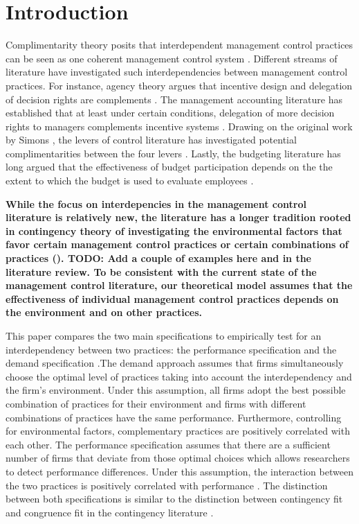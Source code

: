 \documentclass[12pt]{article}
\begin{document}
\section{Introduction}\label{introduction}

Complimentarity theory posits that interdependent management control
practices can be seen as one coherent management control system
\citep{Milgrom1995, Grabner2013}. Different streams of literature have
investigated such interdependencies between management control
practices. For instance, agency theory argues that incentive design and
delegation of decision rights are complements \citep{Holmstrom1994}. The
management accounting literature has established that at least under
certain conditions, delegation of more decision rights to managers
complements incentive systems
\citep{Moers2006, Indjejikian2012, Bouwens2007}. Drawing on the original
work by Simons \citetext{\citeyear{Simons1995}; \citeyear{Simons2000}},
the levers of control literature has investigated potential
complimentarities between the four levers \citep{Widener2007}. Lastly,
the budgeting literature has long argued that the effectiveness of
budget participation depends on the the extent to which the budget is
used to evaluate employees \citep{Brownell1991, Dunk1993}.

\textbf{While the focus on interdepencies in the management control
literature is relatively new, the literature has a longer tradition
rooted in contingency theory of investigating the environmental factors
that favor certain management control practices or certain combinations
of practices (\citet{Grabner2013}). TODO: Add a couple of examples here
and in the literature review. To be consistent with the current state of
the management control literature, our theoretical model assumes that
the effectiveness of individual management control practices depends on
the environment and on other practices.}

This paper compares the two main specifications to empirically test for
an interdependency between two practices: the performance specification
and the demand specification \citep{Grabner2013}.The demand approach
assumes that firms simultaneously choose the optimal level of practices
taking into account the interdependency and the firm's environment.
Under this assumption, all firms adopt the best possible combination of
practices for their environment and firms with different combinations of
practices have the same performance. Furthermore, controlling for
environmental factors, complementary practices are positively correlated
with each other. The performance specification assumes that there are a
sufficient number of firms that deviate from those optimal choices which
allows researchers to detect performance differences. Under this
assumption, the interaction between the two practices is positively
correlated with performance \citep{Athey1998, Grabner2013}. The
distinction between both specifications is similar to the distinction
between contingency fit and congruence fit in the contingency literature
\citep{VandeVen1985a, Gerdin2004}.
\end{document}
